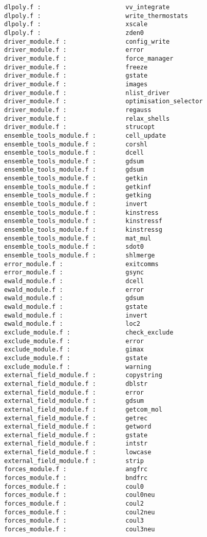 \begin{verbatim}
dlpoly.f :                       vv_integrate 
dlpoly.f :                       write_thermostats 
dlpoly.f :                       xscale 
dlpoly.f :                       zden0 
driver_module.f :                config_write 
driver_module.f :                error 
driver_module.f :                force_manager 
driver_module.f :                freeze 
driver_module.f :                gstate 
driver_module.f :                images 
driver_module.f :                nlist_driver 
driver_module.f :                optimisation_selector 
driver_module.f :                regauss 
driver_module.f :                relax_shells 
driver_module.f :                strucopt 
ensemble_tools_module.f :        cell_update 
ensemble_tools_module.f :        corshl 
ensemble_tools_module.f :        dcell 
ensemble_tools_module.f :        gdsum 
ensemble_tools_module.f :        gdsum 
ensemble_tools_module.f :        getkin
ensemble_tools_module.f :        getkinf
ensemble_tools_module.f :        getking 
ensemble_tools_module.f :        invert 
ensemble_tools_module.f :        kinstress 
ensemble_tools_module.f :        kinstressf 
ensemble_tools_module.f :        kinstressg 
ensemble_tools_module.f :        mat_mul 
ensemble_tools_module.f :        sdot0
ensemble_tools_module.f :        shlmerge 
error_module.f :                 exitcomms 
error_module.f :                 gsync 
ewald_module.f :                 dcell 
ewald_module.f :                 error 
ewald_module.f :                 gdsum 
ewald_module.f :                 gstate 
ewald_module.f :                 invert 
ewald_module.f :                 loc2
exclude_module.f :               check_exclude 
exclude_module.f :               error 
exclude_module.f :               gimax 
exclude_module.f :               gstate 
exclude_module.f :               warning 
external_field_module.f :        copystring 
external_field_module.f :        dblstr
external_field_module.f :        error 
external_field_module.f :        gdsum 
external_field_module.f :        getcom_mol 
external_field_module.f :        getrec 
external_field_module.f :        getword 
external_field_module.f :        gstate 
external_field_module.f :        intstr
external_field_module.f :        lowcase 
external_field_module.f :        strip 
forces_module.f :                angfrc 
forces_module.f :                bndfrc 
forces_module.f :                coul0 
forces_module.f :                coul0neu 
forces_module.f :                coul2 
forces_module.f :                coul2neu 
forces_module.f :                coul3 
forces_module.f :                coul3neu 

\end{verbatim}
